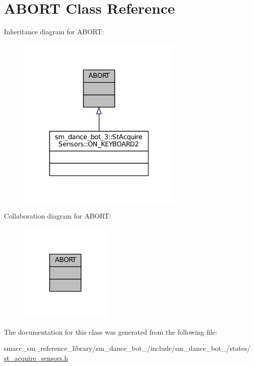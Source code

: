 \hypertarget{classABORT}{}\section{A\+B\+O\+RT Class Reference}
\label{classABORT}


Inheritance diagram for A\+B\+O\+RT\+:
\nopagebreak
\begin{figure}[H]
\begin{center}
\leavevmode
\includegraphics[width=231pt]{classABORT__inherit__graph}
\end{center}
\end{figure}


Collaboration diagram for A\+B\+O\+RT\+:
\nopagebreak
\begin{figure}[H]
\begin{center}
\leavevmode
\includegraphics[width=128pt]{classABORT__coll__graph}
\end{center}
\end{figure}


The documentation for this class was generated from the following file\+:\begin{DoxyCompactItemize}
\item 
smacc\+\_\+sm\+\_\+reference\+\_\+library/sm\+\_\+dance\+\_\+bot\+\_/include/sm\+\_\+dance\+\_\+bot\+\_/states/\hyperlink{3_2include_2sm__dance__bot__3_2states_2st__acquire__sensors_8h}{st\+\_\+acquire\+\_\+sensors.\+h}\end{DoxyCompactItemize}
